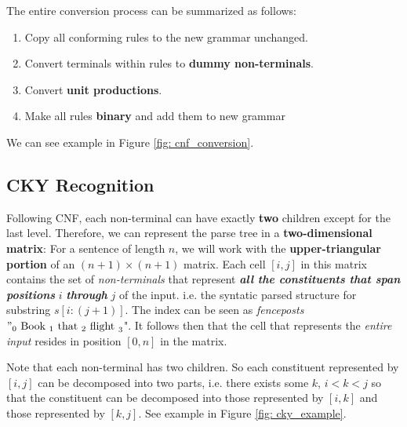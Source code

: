 \documentclass[11pt]{article}
\begin{document}
The entire conversion process can be summarized as follows:
\begin{enumerate}
\item Copy all conforming rules to the new grammar unchanged.
\item Convert terminals within rules to \textbf{dummy non-terminals}.
\item Convert \textbf{unit productions}.
\item Make all rules \textbf{binary} and add them to new grammar
\end{enumerate} We can see example in Figure \ref{fig: cnf_conversion}.

\subsection{CKY Recognition}
Following CNF, each non-terminal can have exactly \textbf{two} children except for the last level. Therefore, we can represent the parse tree in a \textbf{two-dimensional matrix}: For a sentence of length $n$, we will work with the \textbf{upper-triangular portion} of an $(n+1) \times (n+1)$ matrix. Each cell $[i, j]$ in this matrix contains the set of \textit{non-terminals} that represent \emph{\textbf{all the constituents that span positions}} $i$ \emph{\textbf{through}} $j$ of the input. i.e. the syntatic parsed structure for substring $s[i:(j+1)]$. The index can be seen as \emph{fenceposts} $"_0\text{ Book }_1 \text{ that }_2\text{ flight }_3$". It follows then that the cell that represents the \emph{entire input} resides in position $[0,n]$ in the matrix.

Note that each non-terminal has two children. So each constituent represented by $[i,j]$ can be decomposed into two parts, i.e. there exists some $k$, $i<k<j$ so that the constituent can be decomposed into those represented by $[i,k]$ and those represented by $[k,j]$. See example in Figure \ref{fig: cky_example}.
\end{document}
